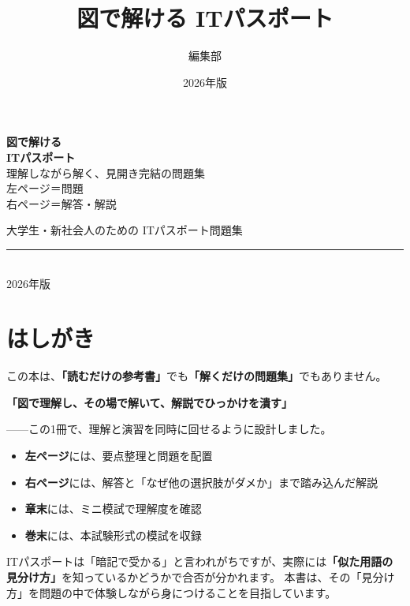 \documentclass[b5paper,11pt,twoside,openany]{ltjsbook}
\title{図で解ける ITパスポート}
\author{編集部}
\date{2026年版}
\begin{document}
\frontmatter

\begin{titlepage}
  \begin{center}
    \vspace*{40mm}

    {\fontsize{36pt}{44pt}\selectfont\sffamily\bfseries 図で解ける}\\[6mm]
    {\fontsize{28pt}{34pt}\selectfont\sffamily\bfseries ITパスポート}\\[14mm]

    {\Large\sffamily 理解しながら解く、見開き完結の問題集}\\[40mm]

    {\large\sffamily
      左ページ＝問題\\[4pt]
      右ページ＝解答・解説
    }

    \vfill

    {\large\sffamily 大学生・新社会人のための ITパスポート問題集}\\[6mm]
    {\color{RuleGray}\rule{0.4\textwidth}{0.4pt}}\\[6mm]
    {\sffamily 2026年版}
  \end{center}
\end{titlepage}

\chapter*{はしがき}

この本は、\textbf{「読むだけの参考書」}でも\textbf{「解くだけの問題集」}でもありません。

\textbf{「図で理解し、その場で解いて、解説でひっかけを潰す」}

——この1冊で、理解と演習を同時に回せるように設計しました。

\begin{itemize}
  \item \textbf{左ページ}には、要点整理と問題を配置
  \item \textbf{右ページ}には、解答と「なぜ他の選択肢がダメか」まで踏み込んだ解説
  \item \textbf{章末}には、ミニ模試で理解度を確認
  \item \textbf{巻末}には、本試験形式の模試を収録
\end{itemize}

ITパスポートは「暗記で受かる」と言われがちですが、実際には\textbf{「似た用語の見分け方」}を知っているかどうかで合否が分かれます。
本書は、その「見分け方」を問題の中で体験しながら身につけることを目指しています。
\end{document}
